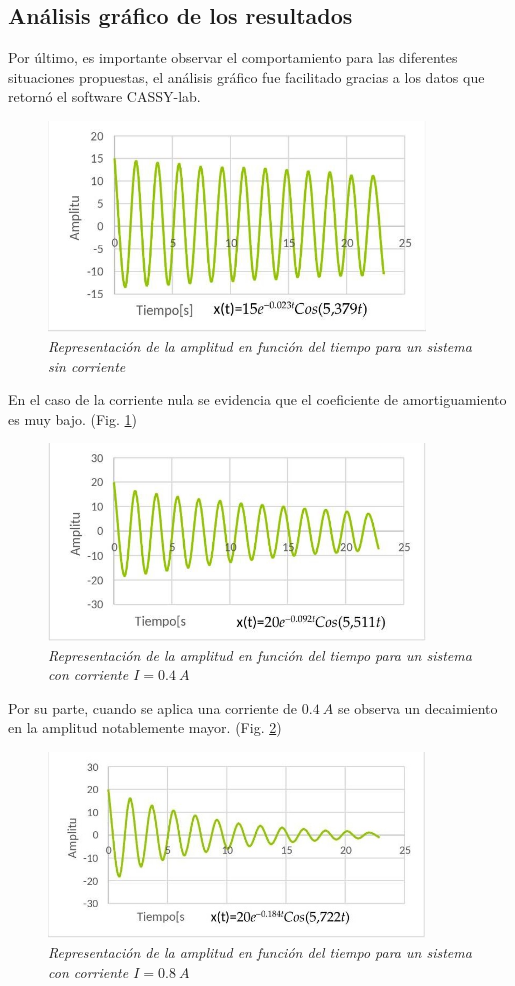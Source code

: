 \documentclass[spanish,notitlepage,letterpaper, 12pt]{article}
\begin{document}
\subsection{Análisis gráfico de los resultados}
Por último, es importante observar el comportamiento para las diferentes situaciones propuestas, el análisis gráfico fue facilitado gracias a los datos que retornó el software CASSY-lab.
\begin{figure}[ht]
    \centering
    \includegraphics[width=10cm]{images/no-current.png}
    \caption{\textit{Representación de la amplitud en función del tiempo para un sistema sin corriente}}
    \label{fig:no-current}
\end{figure}
En el caso de la corriente nula se evidencia que el coeficiente de amortiguamiento es muy bajo. (Fig. \ref{fig:no-current})
\begin{figure}[ht]
    \centering
    \includegraphics[width=10cm]{images/04-current.png}
    \caption{\textit{Representación de la amplitud en función del tiempo para un sistema con corriente $I=0.4\ A$}}
    \label{fig:04-current}
\end{figure}
Por su parte, cuando se aplica una corriente de $0.4\ A$ se observa un decaimiento en la amplitud notablemente mayor. (Fig. \ref{fig:04-current})
\begin{figure}[ht]
    \centering
    \includegraphics[width=10cm]{images/08-current.jpg}
    \caption{\textit{Representación de la amplitud en función del tiempo para un sistema con corriente $I=0.8\ A$}}
    \label{fig:08-current}
\end{figure}
\end{document}
